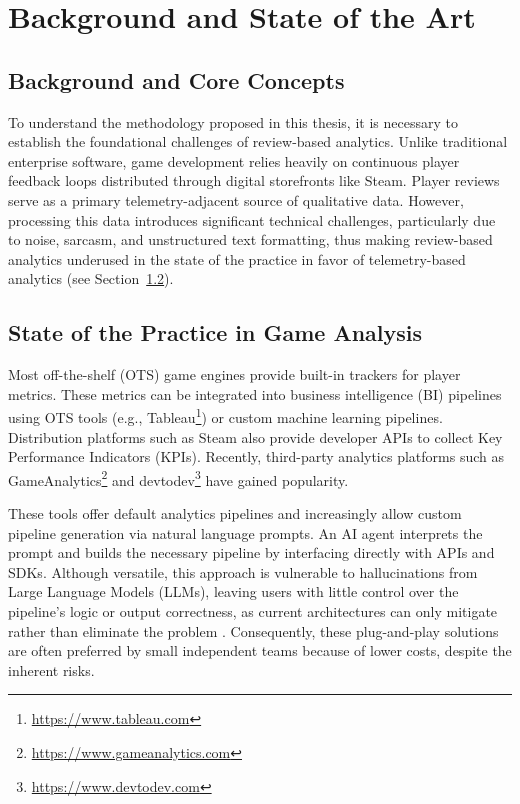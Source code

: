\chapter{Background and State of the Art}
\label{chap:state_of_the_art}

\section{Background and Core Concepts}
\label{sec:background_concepts}
\noindent To understand the methodology proposed in this thesis, it is necessary to establish the foundational challenges of review-based analytics. Unlike traditional enterprise software, game development relies heavily on continuous player feedback loops distributed through digital storefronts like Steam. Player reviews serve as a primary telemetry-adjacent source of qualitative data. However, processing this data introduces significant technical challenges, particularly due to noise, sarcasm, and unstructured text formatting, thus making review-based analytics underused in the state of the practice in favor of telemetry-based analytics (see Section~\ref{sec:sotp}).

\section{State of the Practice in Game Analysis}
\label{sec:sotp}
\noindent Most off-the-shelf (OTS) game engines provide built-in trackers for player metrics. These metrics can be integrated into business intelligence (BI) pipelines using OTS tools (e.g., Tableau\footnote{\url{https://www.tableau.com}}) or custom machine learning pipelines. Distribution platforms such as Steam also provide developer APIs to collect Key Performance Indicators (KPIs). Recently, third-party analytics platforms such as GameAnalytics\footnote{\url{https://www.gameanalytics.com}} and devtodev\footnote{\url{https://www.devtodev.com}} have gained popularity.

These tools offer default analytics pipelines and increasingly allow custom pipeline generation via natural language prompts. An AI agent interprets the prompt and builds the necessary pipeline by interfacing directly with APIs and SDKs. Although versatile, this approach is vulnerable to hallucinations from Large Language Models (LLMs), leaving users with little control over the pipeline's logic or output correctness, as current architectures can only mitigate rather than eliminate the problem \cite{hallucination_nlg}. Consequently, these plug-and-play solutions are often preferred by small independent teams because of lower costs, despite the inherent risks.

